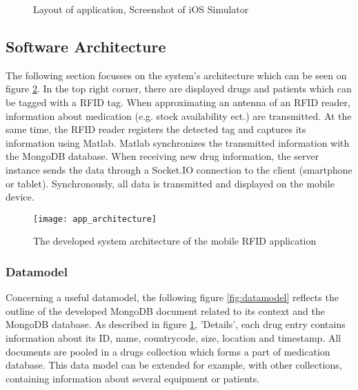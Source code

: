 \begin{figure}
\centering
{}
\caption{\label{fig:app_screenshot}Layout of application, Screenshot of iOS Simulator}
\end{figure}

\subsection{Software Architecture} \label{section_architecture}

The following section focusses on the system's architecture which can be seen on figure \ref{fig:apparchitecture}. In the top right corner, there are displayed drugs and patients which can be tagged with a RFID tag. When approximating an antenna of an RFID reader, information about medication (e.g. stock availability ect.) are transmitted. At the same time, the RFID reader registers the detected tag and captures its information using Matlab. Matlab synchronizes the transmitted information with the MongoDB database. When receiving new drug information, the server instance sends the data through a Socket.IO connection to the client (smartphone or tablet). Synchronously, all data is transmitted and displayed on the mobile device.

\begin{figure}
\centering
\texttt{[image: app\_architecture]} 
\caption{\label{fig:apparchitecture}The developed system architecture of the mobile RFID application} 
\end{figure}

\subsubsection{Datamodel}

Concerning a useful datamodel, the following figure \ref{fig:datamodel} reflects the outline of the developed MongoDB document related to its context and the MongoDB database. As described in figure \ref{fig:app_screenshot}, 'Details', each drug entry contains information about its ID, name, countrycode, size, location and timestamp. All documents are pooled in a drugs collection which forms a part of medication database. This data model can be extended for example, with other collections, containing information about several equipment or patients. 

